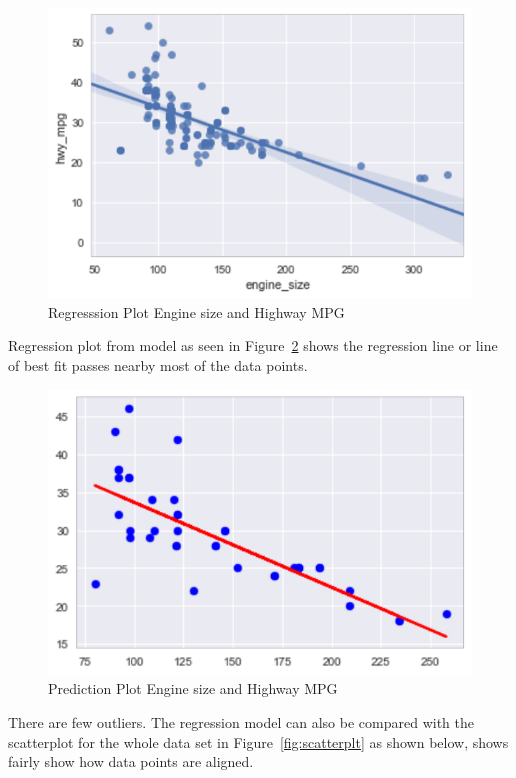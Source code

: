  \begin{figure}[!h]
  \includegraphics[scale=1.0]{images/reg_plot.pdf}
  \caption{Regresssion Plot Engine size and Highway MPG}
\label{fig:regplt}
\end{figure}
 
 
 Regression plot from model as seen in Figure~\ref{fig:predplt} shows 
 the regression line or line of best fit passes nearby most of the data
 points. 
 
 \begin{figure}[htb]
  \includegraphics[scale=1.0]{images/plot_pred_test_set.pdf}
  \caption{Prediction Plot Engine size and Highway MPG}
  \label{fig:predplt}
\end{figure}
 
 
 There are few outliers. The regression model can also be compared with 
 the scatterplot for the whole data set
 in Figure~\ref{fig:scatterplt} as shown below, shows fairly show how data 
 points are aligned.
 
